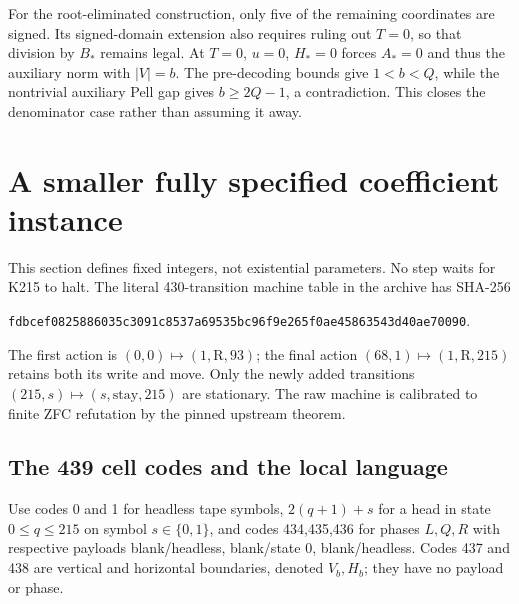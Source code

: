 \documentclass[11pt]{article}
\begin{document}
For the root-eliminated construction, only five of the remaining coordinates are signed. Its signed-domain extension also requires ruling out $T=0$, so that division by $B_*$ remains legal. At $T=0$, $u=0$, $H_*=0$ forces $A_*=0$ and thus the auxiliary norm with $|V|=b$. The pre-decoding bounds give $1<b<Q$, while the nontrivial auxiliary Pell gap gives $b\geq2Q-1$, a contradiction. This closes the denominator case rather than assuming it away.



\section{A smaller fully specified coefficient instance}\label{sec:coefficients}

This section defines fixed integers, not existential parameters. No step waits for K215 to halt. The literal 430-transition machine table in the archive has SHA-256
\begin{center}\small
\texttt{fdbcef0825886035c3091c8537a69535bc96f9e265f0ae45863543d40ae70090}.
\end{center}
The first action is $(0,0)\mapsto(1,\mathrm R,93)$; the final action
$(68,1)\mapsto(1,\mathrm R,215)$ retains both its write and move.
Only the newly added transitions $(215,s)\mapsto(s,\mathrm{stay},215)$ are stationary. The raw machine is calibrated to finite ZFC refutation by the pinned upstream theorem.

\subsection{The 439 cell codes and the local language}

Use codes 0 and 1 for headless tape symbols, $2(q+1)+s$ for a head in state $0\leq q\leq215$ on symbol $s\in\{0,1\}$, and codes 434,435,436 for phases $L,Q,R$ with respective payloads blank/headless, blank/state 0, blank/headless. Codes 437 and 438 are vertical and horizontal boundaries, denoted $V_b,H_b$; they have no payload or phase.
\end{document}

